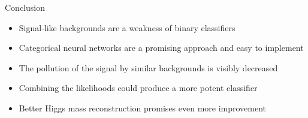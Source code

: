 \documentclass[10pt, UKenglish]{beamer}
\begin{document}
\begin{frame}{Conclusion}
\begin{itemize}
  \item Signal-like backgrounds are a weakness of binary classifiers
  \vspace{0.25cm}
  \item Categorical neural networks are a promising approach and easy to implement 
  \vspace{0.25cm}
  \item The pollution of the signal by similar backgrounds is visibly decreased
  \vspace{0.25cm}
  \item Combining the likelihoods could produce a more potent classifier
  \vspace{0.25cm}
  \item Better Higgs mass reconstruction promises even more improvement
\end{itemize}
\end{frame}



%
%

  
\end{document}
